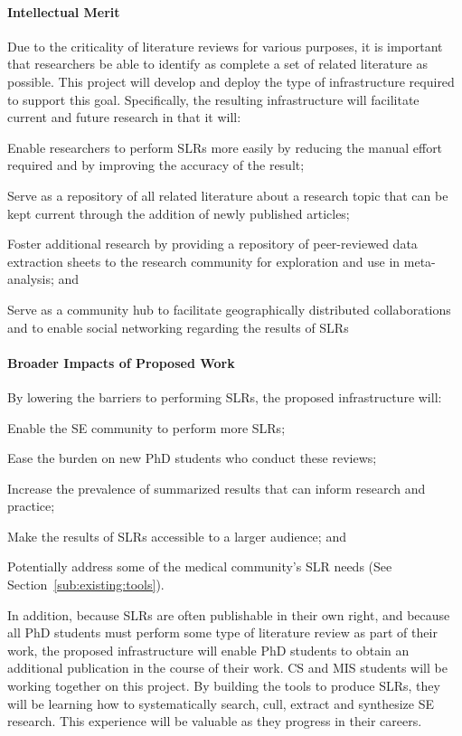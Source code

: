 \paragraph{Intellectual Merit}
Due to the criticality of literature reviews for various purposes, it is important that researchers be able to identify as complete a set of related literature as possible. 
This project will develop and deploy the type of infrastructure required to support this goal. 
Specifically, the resulting infrastructure will facilitate current and future research in that it will:
\vspace*{-4pt}
\begin{itemize*}
	\item Enable researchers to perform SLRs more easily by reducing the manual effort required and by improving the accuracy of the result; 
	\item Serve as a repository of all related literature about a research topic that can be kept current through the addition of newly published articles;
	\item Foster additional research by providing a repository of peer-reviewed data extraction sheets to the research community for exploration and use in meta-analysis; and
	\item Serve as a community hub to facilitate geographically distributed collaborations and to enable social networking regarding the results of SLRs
\end{itemize*}
\paragraph{Broader Impacts of Proposed Work}
By lowering the barriers to performing SLRs, the proposed infrastructure will:
\vspace*{-4pt}
\begin{itemize*}
	\item Enable the SE community to perform more SLRs;
	\item Ease the burden on new PhD students who conduct these reviews;
	\item Increase the prevalence of summarized results that can inform research and practice;
	\item Make the results of SLRs accessible to a larger audience; and
	\item Potentially address some of the medical community's SLR needs (See Section~\ref{sub:existing:tools}).
\end{itemize*}
\vspace*{-4pt}

In addition, because SLRs are often publishable in their own right, and because all PhD students must perform some type of literature review as part of their work, the proposed infrastructure will enable PhD students to obtain an additional publication in the course of their work.
CS and MIS students will be working together on this project.  
By building the tools to produce SLRs, they will be learning how to systematically search, cull, extract and synthesize SE research.  
This experience will be valuable as they progress in their careers. 



